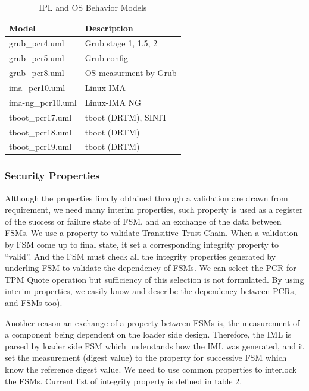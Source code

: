 \documentclass[12pt,a4paper]{article}
\begin{document}
\begin{table}
\caption{IPL and OS Behavior Models}
\label{table:osmodel}
\begin{center}
\begin{tabular}{|l|l|}
	\hline
	Model & Description  \\
	\hline 	\hline
	grub\_pcr4.uml &  Grub stage 1, 1.5, 2 \\
	\hline
	grub\_pcr5.uml &  Grub config \\
	\hline
	grub\_pcr8.uml &  OS measurment by Grub \\
	\hline
	ima\_pcr10.uml &  Linux-IMA \\
	\hline
	ima-ng\_pcr10.uml &  Linux-IMA NG \\
	\hline
	tboot\_pcr17.uml & tboot (DRTM), SINIT  \\
	\hline
	tboot\_pcr18.uml & tboot (DRTM)  \\
	\hline
	tboot\_pcr19.uml & tboot (DRTM)  \\
	\hline
\end{tabular}
\end{center}
\end{table}


\subsubsection{Security Properties} 

Although the properties finally obtained through a validation are drawn from requirement, we
need many interim properties, such property is used as a register of the success or failure state of
FSM, and an exchange of the data between FSMs. We use a property to validate Transitive Trust
Chain. When a validation by FSM come up to final state, it set a corresponding integrity property
to “valid”. And the FSM must check all the integrity properties generated by underling FSM to
validate the dependency of FSMs. We can select the PCR for TPM Quote operation but sufficiency
of this selection is not formulated. By using interim properties, we easily know and describe the
dependency between PCRs, and FSMs too).

Another reason an exchange of a property between FSMs is, the measurement of a component
being dependent on the loader side design. Therefore, the IML is parsed by loader side FSM which
understands how the IML was generated, and it set the measurement (digest value) to the property
for successive FSM which know the reference digest value. We need to use common properties to
interlock the FSMs. Current list of integrity property is defined in table 2.
\end{document}
